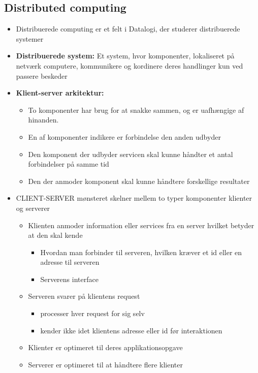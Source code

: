 \documentclass[a4, english]{article}
\begin{document}
\subsection{Distributed computing}
\begin{itemize}
	\item Distribuerede computing er et felt i Datalogi, der studerer distribuerede systemer
  \item \textbf{Distribuerede system:} Et system, hvor komponenter, lokaliseret på netværk computere, kommunikere og kordinere deres handlinger kun ved passere beskeder 
  \item \textbf{Klient-server arkitektur:}
  \begin{itemize}
  	\item To komponenter har brug for at snakke sammen, og er uafhængige af hinanden.
    \item En af komponenter indikere er forbindelse den anden udbyder
    \item Den komponent der udbyder servicen skal kunne håndter et antal forbindelser på samme tid
    \item Den der anmoder komponent skal kunne håndtere forskellige resultater
  \end{itemize}
  \item CLIENT-SERVER mønsteret skelner mellem to typer komponenter klienter og serverer
  \begin{itemize}
  	\item Klienten anmoder information eller services fra en server hvilket betyder at den skal kende
    \begin{itemize}
    	\item Hvordan man forbinder til serveren, hvilken kræver et id eller en adresse til serveren
      \item Serverens interface
    \end{itemize}
    \item Serveren svarer på klientens request
    \begin{itemize}
    	\item processer hver request for sig selv
      \item kender ikke idet klientens adresse eller id før interaktionen  
    \end{itemize}
    \item Klienter er optimeret til deres applikationsopgave 
    \item Serverer er optimeret til at håndtere flere klienter
  \end{itemize}

\end{itemize}
\end{document}
